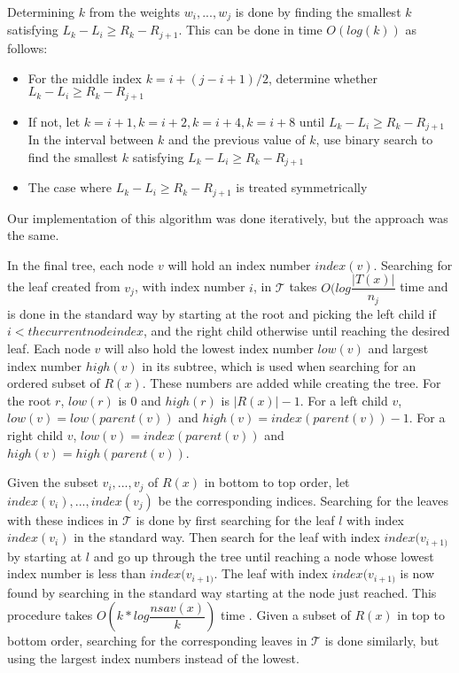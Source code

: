 Determining $k$ from the weights ${w_i, ..., w_j}$ is done by finding the smallest $k$ satisfying $L_k-L_i \ge R_k-R_{j+1}$. This can be done in time $O(log(k))$ as follows:

\begin{itemize}
	\item For the middle index $k=i+(j-i+1)/2$, determine whether $L_k-L_i \ge R_k-R_{j+1}$
	\item If not, let $k=i+1, k=i+2, k=i+4, k=i+8$ until $L_k-L_i \ge R_k-R_{j+1}$
	\subitem In the interval between $k$ and the previous value of $k$, use binary search to find the smallest $k$ satisfying $L_k-L_i \ge R_k-R_{j+1}$
	\item The case where $L_k-L_i \ge R_k-R_{j+1}$ is treated symmetrically
\end{itemize}

Our implementation of this algorithm was done iteratively, but the approach was the same.

In the final tree, each node $v$ will hold an index number $index(v)$. Searching for the leaf created from $v_j$, with index number $i$, in $\mathcal{T}$ takes $O(log \dfrac{|T(x)|}{n_j}$ time  and is done in the standard way by starting at the root and picking the left child if $i < the current node index$, and the right child otherwise until reaching the desired leaf. Each node $v$ will also hold the lowest index number $low(v)$ and largest index number $high(v)$ in its subtree, which is used when searching for an ordered subset of $R(x)$. These numbers are added while creating the tree. For the root $r$, $low(r)$ is 0 and $high(r)$ is $|R(x)|-1$. For a left child $v$, $low(v)=low(parent(v))$ and $high(v)=index(parent(v))-1$. For a right child $v$, $low(v)=index(parent(v))$ and $high(v)=high(parent(v))$.

Given the subset ${v_i, ..., v_j}$ of $R(x)$ in bottom to top order, let ${index(v_i), ..., index(v_j)}$ be the corresponding indices. Searching for the leaves with these indices in $\mathcal{T}$ is done by first searching for the leaf $l$ with index $index(v_i)$ in the standard way. Then search for the leaf with index $index(v_{i+1)}$ by starting at $l$ and go up through the tree until reaching a node whose lowest index number is less than $index(v_{i+1)}$. The leaf with index $index(v_{i+1)}$ is now found by searching in the standard way starting at the node just reached. This procedure takes $O(k*log \dfrac{nsav(x)}{k})$ time . Given a subset of $R(x)$ in top to bottom order, searching for the corresponding leaves in $\mathcal{T}$ is done similarly, but using the largest index numbers instead of the lowest.

